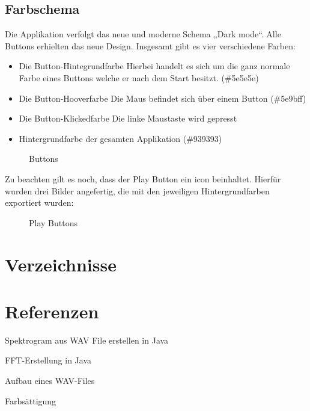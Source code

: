 \documentclass[12pt,a4paper]{article}
\begin{document}
\subsection{Farbschema}
Die Applikation verfolgt das neue und moderne Schema „Dark mode“. Alle Buttons erhielten das neue Design. Insgesamt gibt es vier verschiedene Farben:
\begin{itemize}
	\item Die  Button-Hintegrundfarbe \newline
	Hierbei handelt es sich um die ganz normale Farbe eines Buttons welche er nach dem Start besitzt. (\#5e5e5e)
	\item Die Button-Hooverfarbe \newline
	Die Maus befindet sich über einem Button (\#5e9bff)
	\item Die Button-Klickedfarbe \newline
	Die linke Maustaste wird gepresst
	\item Hintergrundfarbe der gesamten Applikation	(\#939393)

	
\end{itemize}
\begin{figure} [h]%
	\centering
	\label{fig:buttons} 
	\caption{Buttons}
\end{figure}
Zu beachten gilt es noch, dass der Play Button ein icon beinhaltet. Hierfür wurden drei Bilder angefertig, die mit den jeweiligen Hintergrundfarben exportiert wurden:
\begin{figure} [h]%
	\centering
	\label{fig:playbuttons} 
	\caption{Play Buttons}
\end{figure}
\newpage
\section{Verzeichnisse}
\listoffigures
\listoftables
\section{Referenzen}

Spektrogram aus WAV File erstellen in Java\cite{wavtospektrogram}

FFT-Erstellung in Java\cite{fftinjava}

Aufbau eines WAV-Files\cite{wavFile} \cite{wavFileEndian}

Farbsättigung \cite{saettigung}
\end{document}
